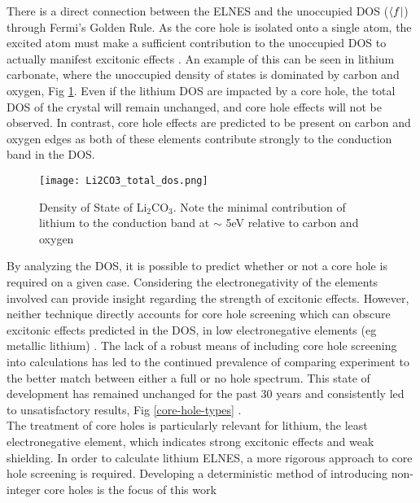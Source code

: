 There is a direct connection between the ELNES and the unoccupied DOS ($\bra{f}$) through Fermi's Golden Rule.  As the core hole is isolated onto a single atom, the excited atom must make a sufficient contribution to the unoccupied DOS to actually manifest excitonic effects  \cite{mauchamp_core-hole_2009}.   An example of this can be seen in lithium carbonate, where the unoccupied density of states is dominated by carbon and oxygen, Fig \ref{LCO_dos}.  Even if the lithium DOS are impacted by a core hole, the total DOS of the crystal will remain unchanged, and core hole effects will not be observed.  In contrast, core hole effects are predicted to be present on carbon and oxygen edges as both of these elements contribute strongly to the conduction band in the DOS. \\

\begin{figure}
	\centering
	\texttt{[image: Li2CO3\_total\_dos.png]}
	\caption{Density of State of $ \mathrm{Li_2CO_3} $. Note the minimal contribution of lithium to the conduction band at $ \sim $ 5eV relative to carbon and oxygen}
	\label{LCO_dos}
	
\end{figure}


By analyzing the DOS, it is possible to predict whether or not a core hole is required on a given case. Considering the electronegativity of the elements involved can provide insight regarding the strength of excitonic effects.  However, neither technique directly accounts for core hole screening which can obscure excitonic effects predicted in the DOS, in low electronegative elements (eg metallic lithium) \cite{mauchamp_ab_2006}. The lack of a robust means of including core hole screening into calculations has led to the continued prevalence of comparing experiment to the better match between either a full or no hole spectrum. This state of development has remained unchanged for the past 30 years and consistently led to unsatisfactory results, Fig \ref{core-hole-types} \cite{ brydson_further_1988, hardcastle_robust_2017,bad_hole1,bad_hole2, bad_hole3, bad_hole4, bad_hole5, bad_hole6, bad_hole7, bad_hole8,bad_hole9, bad_hole10}. \\

The treatment of core holes is particularly relevant for lithium, the least electronegative element, which indicates strong excitonic effects and weak shielding. In order to  calculate lithium ELNES, a more rigorous approach to core hole screening is required.  Developing a deterministic method of introducing non-integer core holes is the focus of this work


